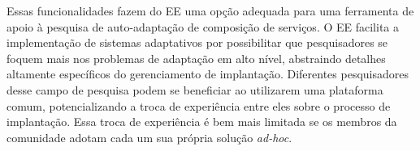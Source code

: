 \begin{description}
Essas funcionalidades fazem do EE uma opção adequada para uma ferramenta de apoio 
à pesquisa de auto-adaptação de composição de serviços.
O EE facilita a implementação de sistemas adaptativos
por possibilitar que pesquisadores se foquem mais nos problemas de adaptação em
alto nível, abstraindo detalhes altamente específicos do gerenciamento de implantação.
Diferentes pesquisadores desse campo de pesquisa podem se beneficiar ao utilizarem uma plataforma comum,
potencializando a troca de experiência entre eles sobre o processo de implantação. 
Essa troca de experiência é bem mais limitada se os membros da comunidade adotam cada um 
sua própria solução \emph{ad-hoc}.

\end{description}

